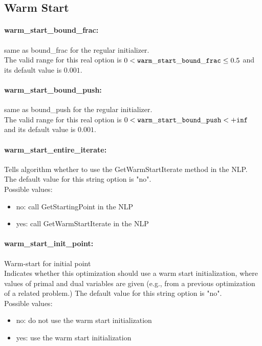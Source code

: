 \subsection{Warm Start}
\label{sec:WarmStart}
\paragraph{warm\_start\_bound\_frac:}\label{opt:warm_start_bound_frac} same as bound\_frac for the regular initializer. \\
 The valid range for this real option is 
$0 <  {\tt warm\_start\_bound\_frac } \le 0.5$
and its default value is $0.001$.


\paragraph{warm\_start\_bound\_push:}\label{opt:warm_start_bound_push} same as bound\_push for the regular initializer. \\
 The valid range for this real option is 
$0 <  {\tt warm\_start\_bound\_push } <  {\tt +inf}$
and its default value is $0.001$.


\paragraph{warm\_start\_entire\_iterate:}\label{opt:warm_start_entire_iterate} Tells algorithm whether to use the GetWarmStartIterate method in the NLP. \\
 The default value for this string option is "no".
\\ 
Possible values:
\begin{itemize}
   \item no: call GetStartingPoint in the NLP
   \item yes: call GetWarmStartIterate in the NLP
\end{itemize}

\paragraph{warm\_start\_init\_point:}\label{opt:warm_start_init_point} Warm-start for initial point \\
 Indicates whether this optimization should use a warm start initialization, where values of primal and dual variables are given (e.g., from a previous optimization of a related problem.) The default value for this string option is "no".
\\ 
Possible values:
\begin{itemize}
   \item no: do not use the warm start initialization
   \item yes: use the warm start initialization
\end{itemize}

